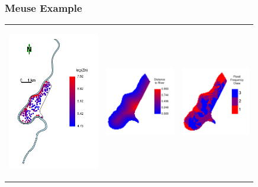 \documentclass[mathserif,compress]{beamer}\usepackage{graphicx, color}
\begin{document}
\begin{frame}[fragile]
\frametitle{Meuse Example}

	






	\begin{tabular} {p{3cm} p{3cm} p{3cm}}
		\vspace{-.5cm}
		\begin{center}
			\includegraphics[width = 4cm]{figure/colorPointsMeuseLogZN-plot}
		\end{center}  &
		\vspace{1cm}	
		\begin{center}
			\includegraphics[width = 3cm]{figure/meuseDist-plot}
		\end{center}  &
		\vspace{1cm}
		\begin{center}
			\includegraphics[width = 3cm]{figure/meuseFFreq-plot} 
		\end{center}
	\end{tabular}

\end{frame}

\end{document}
